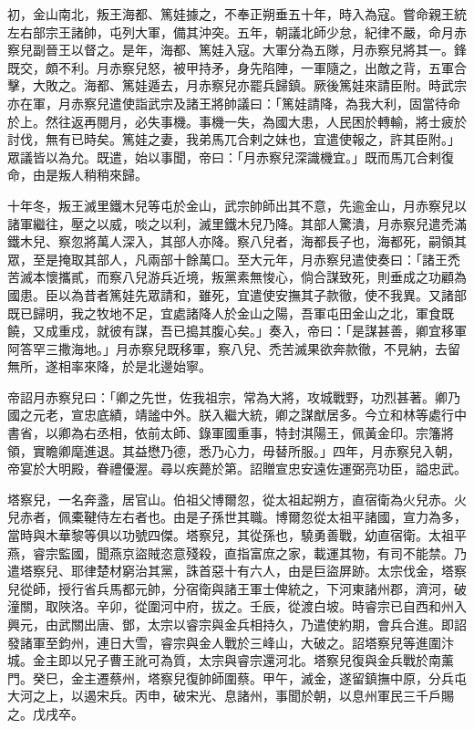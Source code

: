 \begin{pinyinscope}
 初，金山南北，叛王海都、篤娃據之，不奉正朔垂五十年，時入為寇。嘗命親王統左右部宗王諸帥，屯列大軍，備其沖突。五年，朝議北師少怠，紀律不嚴，命月赤察兒副晉王以督之。是年，海都、篤娃入寇。大軍分為五隊，月赤察兒將其一。鋒既交，頗不利。月赤察兒怒，被甲持矛，身先陷陣，一軍隨之，出敵之背，五軍合擊，大敗之。海都、篤娃遁去，月赤察兒亦罷兵歸鎮。厥後篤娃來請臣附。時武宗亦在軍，月赤察兒遣使詣武宗及諸王將帥議曰：「篤娃請降，為我大利，固當待命於上。然往返再閱月，必失事機。事機一失，為國大患，人民困於轉輸，將士疲於討伐，無有已時矣。篤娃之妻，我弟馬兀合剌之妹也，宜遣使報之，許其臣附。」眾議皆以為允。既遣，始以事聞，帝曰：「月赤察兒深識機宜。」既而馬兀合剌復命，由是叛人稍稍來歸。



 十年冬，叛王滅里鐵木兒等屯於金山，武宗帥師出其不意，先逾金山，月赤察兒以諸軍繼往，壓之以威，啖之以利，滅里鐵木兒乃降。其部人驚潰，月赤察兒遣禿滿鐵木兒、察忽將萬人深入，其部人亦降。察八兒者，海都長子也，海都死，嗣領其眾，至是掩取其部人，凡兩部十餘萬口。至大元年，月赤察兒遣使奏曰：「諸王禿苦滅本懷攜貳，而察八兒游兵近境，叛黨素無悛心，倘合謀致死，則垂成之功顧為國患。臣以為昔者篤娃先眾請和，雖死，宜遣使安撫其子款徹，使不我異。又諸部既已歸明，我之牧地不足，宜處諸降人於金山之陽，吾軍屯田金山之北，軍食既饒，又成重戍，就彼有謀，吾已搗其腹心矣。」奏入，帝曰：「是謀甚善，卿宜移軍阿答罕三撒海地。」月赤察兒既移軍，察八兒、禿苦滅果欲奔款徹，不見納，去留無所，遂相率來降，於是北邊始寧。



 帝詔月赤察兒曰：「卿之先世，佐我祖宗，常為大將，攻城戰野，功烈甚著。卿乃國之元老，宣忠底績，靖謐中外。朕入繼大統，卿之謀猷居多。今立和林等處行中書省，以卿為右丞相，依前太師、錄軍國重事，特封淇陽王，佩黃金印。宗籓將領，實瞻卿麾進退。其益懋乃德，悉乃心力，毋替所服。」四年，月赤察兒入朝，帝宴於大明殿，眷禮優渥。尋以疾薨於第。詔贈宣忠安遠佐運弼亮功臣，謚忠武。



 塔察兒，一名奔盞，居官山。伯祖父博爾忽，從太祖起朔方，直宿衛為火兒赤。火兒赤者，佩橐鞬侍左右者也。由是子孫世其職。博爾忽從太祖平諸國，宣力為多，當時與木華黎等俱以功號四傑。塔察兒，其從孫也，驍勇善戰，幼直宿衛。太祖平燕，睿宗監國，聞燕京盜賊恣意殘殺，直指富庶之家，載運其物，有司不能禁。乃遣塔察兒、耶律楚材窮治其黨，誅首惡十有六人，由是巨盜屏跡。太宗伐金，塔察兒從師，授行省兵馬都元帥，分宿衛與諸王軍士俾統之，下河東諸州郡，濟河，破潼關，取陜洛。辛卯，從圍河中府，拔之。壬辰，從渡白坡。時睿宗已自西和州入興元，由武關出唐、鄧，太宗以睿宗與金兵相持久，乃遣使約期，會兵合進。即詔發諸軍至鈞州，連日大雪，睿宗與金人戰於三峰山，大破之。詔塔察兒等進圍汴城。金主即以兄子曹王訛可為質，太宗與睿宗還河北。塔察兒復與金兵戰於南薰門。癸巳，金主遷蔡州，塔察兒復帥師圍蔡。甲午，滅金，遂留鎮撫中原，分兵屯大河之上，以遏宋兵。丙申，破宋光、息諸州，事聞於朝，以息州軍民三千戶賜之。戊戌卒。




\end{pinyinscope}
